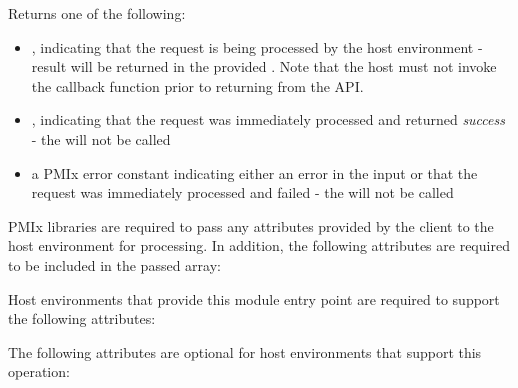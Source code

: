 Returns one of the following:

\begin{itemize}
    \item {}, indicating that the request is being processed by the host environment - result will be returned in the provided . Note that the host must not invoke the callback function prior to returning from the \ac{API}.
    \item {}, indicating that the request was immediately processed and returned \textit{success} - the  will not be called
    \item a PMIx error constant indicating either an error in the input or that the request was immediately processed and failed - the  will not be called
\end{itemize}

\reqattrstart
\ac{PMIx} libraries are required to pass any attributes provided by the client to the host environment for processing. In addition, the following attributes are required to be included in the passed  array:


\divider

Host environments that provide this module entry point are required to support the following attributes:


\reqattrend

\optattrstart
The following attributes are optional for host environments that support this operation:


\optattrend

